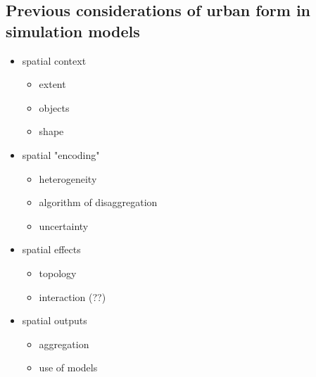 \documentclass[Afour,sageh,times]{sagej}
\begin{document}
\subsection{Previous considerations of urban form in simulation models}

\begin{itemize}
\item spatial context
\begin{itemize}
\item extent
\item objects
\item shape
\end{itemize}

\item spatial "encoding"
\begin{itemize}
\item heterogeneity
\item algorithm of disaggregation
\item uncertainty
\end{itemize}

\item spatial effects
\begin{itemize}
\item topology
\item interaction (??)
\end{itemize}

\item spatial outputs
\begin{itemize}
\item aggregation
\item use of models
\end{itemize}
\end{itemize}
\end{document}
